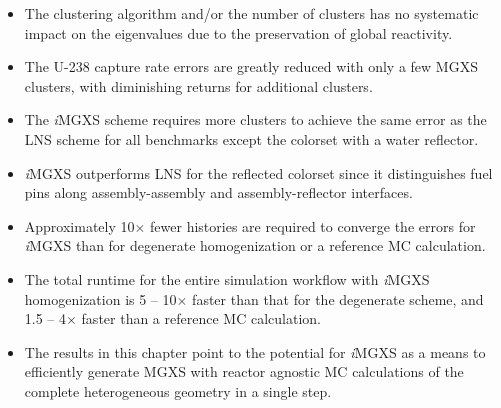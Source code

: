 \vfill
\begin{highlightsbox}[frametitle=Highlights]
\begin{itemize}
  \item The clustering algorithm and/or the number of clusters has no systematic impact on the eigenvalues due to the preservation of global reactivity.
  \item The U-238 capture rate errors are greatly reduced with only a few \ac{MGXS} clusters, with diminishing returns for additional clusters.
  \item The \textit{i}\ac{MGXS} scheme requires more clusters to achieve the same error as the \ac{LNS} scheme for all benchmarks except the colorset with a water reflector.
  \item \textit{i}\ac{MGXS} outperforms \ac{LNS} for the reflected colorset since it distinguishes fuel pins along assembly-assembly and assembly-reflector interfaces.
  \item Approximately 10$\times$ fewer histories are required to converge the errors for \textit{i}\ac{MGXS} than for degenerate homogenization or a reference \ac{MC} calculation.
  \item The total runtime for the entire simulation workflow with \textit{i}\ac{MGXS} homogenization is 5 -- 10$\times$ faster than that for the degenerate scheme, and 1.5 -- 4$\times$ faster than a reference \ac{MC} calculation.
  \item The results in this chapter point to the potential for \textit{i}\ac{MGXS} as a means to efficiently generate \ac{MGXS} with reactor agnostic \ac{MC} calculations of the complete heterogeneous geometry in a single step.
\end{itemize}
\end{highlightsbox}
\vfill
